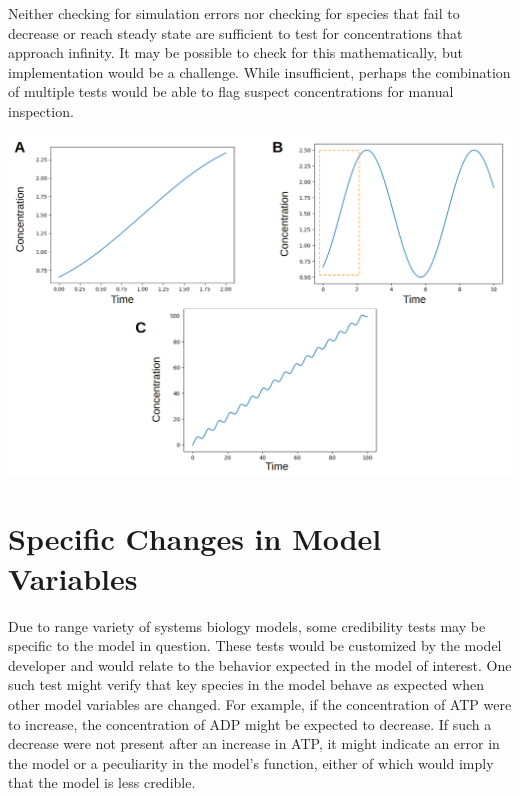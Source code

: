 \documentclass[12pt]{report}
\begin{document}
Neither checking for simulation errors nor checking for species that fail to decrease or reach steady state are sufficient to test for concentrations that approach infinity. It may be possible to check for this mathematically, but implementation would be a challenge. While insufficient, perhaps the combination of multiple tests would be able to flag suspect concentrations for manual inspection.


\begin{center}
    \includegraphics[width=15cm]{images/infinity.png}
    \label{fig:infinity}
\end{center}


\section{Specific Changes in Model Variables}
Due to range variety of systems biology models, some credibility tests may be specific to the model in question. These tests would be customized by the model developer and would relate to the behavior expected in the model of interest. One such test might verify that key species in the model behave as expected when other model variables are changed. For example, if the concentration of ATP were to increase, the concentration of ADP might be expected to decrease. If such a decrease were not present after an increase in ATP, it might indicate an error in the model or a peculiarity in the model's function, either of which would imply that the model is less credible. 
\end{document}
